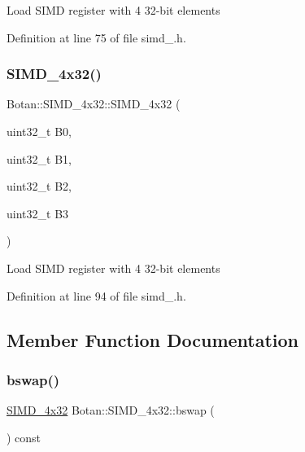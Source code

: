 Load S\+I\+MD register with 4 32-\/bit elements 

Definition at line 75 of file simd\+\_.\+h.

\mbox{\label{class_botan_1_1_s_i_m_d__4x32_a630d5063dfa518ebd4db33136a1364c7}} 
\subsubsection{\texorpdfstring{S\+I\+M\+D\+\_\+4x32()}{SIMD\_4x32()}\hspace{0.1cm}{\footnotesize\ttfamily [3/3]}}
{\footnotesize\ttfamily Botan\+::\+S\+I\+M\+D\+\_\+4x32\+::\+S\+I\+M\+D\+\_\+4x32 (\begin{DoxyParamCaption}\item[{uint32\+\_\+t}]{B0,  }\item[{uint32\+\_\+t}]{B1,  }\item[{uint32\+\_\+t}]{B2,  }\item[{uint32\+\_\+t}]{B3 }\end{DoxyParamCaption})\hspace{0.3cm}{\ttfamily [inline]}}

Load S\+I\+MD register with 4 32-\/bit elements 

Definition at line 94 of file simd\+\_.\+h.



\subsection{Member Function Documentation}
\mbox{\label{class_botan_1_1_s_i_m_d__4x32_a7efd5ff4f90609b6c7c5ad88d6814f77}} 
\subsubsection{\texorpdfstring{bswap()}{bswap()}}
{\footnotesize\ttfamily \mbox{\hyperlink{class_botan_1_1_s_i_m_d__4x32}{S\+I\+M\+D\+\_\+4x32}} Botan\+::\+S\+I\+M\+D\+\_\+4x32\+::bswap (\begin{DoxyParamCaption}{ }\end{DoxyParamCaption}) const\hspace{0.3cm}{\ttfamily [inline]}}

